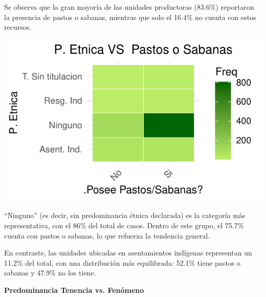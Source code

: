 \documentclass[]{tufte-handout}
\begin{document}
Se observa que la gran mayoría de las unidades productoras (83.6\%)
reportaron la presencia de pastos o sabanas, mientras que solo el 16.4\%
no cuenta con estos recursos.

\begin{marginfigure}
\includegraphics[width=1.2\linewidth]{Informe_files/figure-latex/heat3-1} \end{marginfigure}

``Ninguno'' (es decir, sin predominancia étnica declarada) es la
categoría más representativa, con el 86\% del total de casos. Dentro de
este grupo, el 75.7\% cuenta con pastos o sabanas, lo que refuerza la
tendencia general.

En contraste, las unidades ubicadas en asentamientos indígenas
representan un 11.2\% del total, con una distribución más equilibrada:
52.1\% tiene pastos o sabanas y 47.9\% no los tiene.

\begin{center}
\textbf{Predominancia Tenencia vs. Fenómeno}
\end{center}
\end{document}
